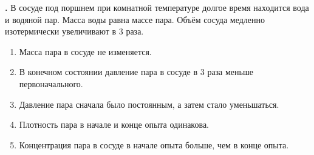 \documentclass[12pt,a4paper]{article}
\newif\ifShowSolutions
\newcounter{banktask}
\newcommand{\BankTask}[3]{%
  \refstepcounter{banktask}%
  \Needspace{35mm}\par\medskip\noindent\begin{minipage}{\linewidth}%
  \noindent\textbf{\thebanktask.}\quad #2\par
  \ifShowSolutions
    #3\par
    \ifdefined\TutorEdition
      \ifcsname TutorSource#1\endcsname
        \smallskip{\small\csname TutorSource#1\endcsname\par}%
      \fi
    \fi
  \fi
  \end{minipage}\par\medskip
}
\begin{document}
\BankTask{12DC5B}{
В сосуде под поршнем при комнатной температуре долгое время находится вода и водяной пар. Масса воды равна массе пара. Объём сосуда медленно изотермически увеличивают в \(3\) раза.
\begin{enumerate}
\item Масса пара в сосуде не изменяется.
\item В конечном состоянии давление пара в сосуде в \(3\) раза меньше первоначального.
\item Давление пара сначала было постоянным, а затем стало уменьшаться.
\item Плотность пара в начале и конце опыта одинакова.
\item Концентрация пара в сосуде в начале опыта больше, чем в конце опыта.
\end{enumerate}
}{
\smallskip\noindent\textbf{Решение от GPT}\par
Первоначально пар насыщенный. Пока вода испаряется, при постоянной температуре давление и плотность пара постоянны. Обозначим начальную массу пара через \(m\), начальный объём сосуда через \(V\). Пренебрегая объёмом жидкости, полное испарение воды происходит при объёме \(2V\); далее пар становится ненасыщенным. В конце
\[
m_{\text{п},f}=2m,\qquad
\frac{\rho_f}{\rho_i}=\frac{2m/(3V)}{m/V}=\frac23,\qquad
\frac{p_f}{p_i}=\frac{n_f}{n_i}=\frac23.
\]
\begin{enumerate}
\item Неверно: масса пара увеличилась в \(2\) раза.
\item Неверно: давление уменьшилось примерно в \(1{,}5\) раза.
\item Верно: сначала пар оставался насыщенным, затем его давление уменьшалось.
\item Неверно: конечная плотность пара меньше начальной.
\item Верно: концентрация пропорциональна плотности, поэтому \(n_i>n_f\).
\end{enumerate}
Ответ: \(35\).
}
\end{document}
